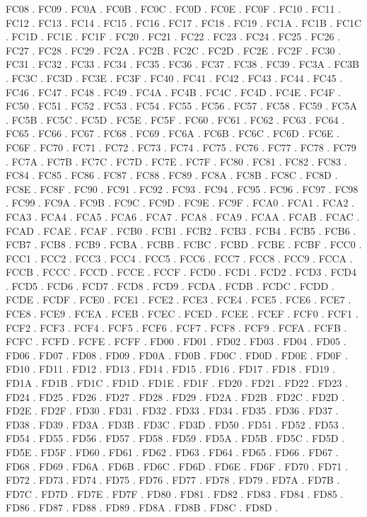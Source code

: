 FC08 .
FC09 .
FC0A .
FC0B .
FC0C .
FC0D .
FC0E .
FC0F .
FC10 .
FC11 .
FC12 .
FC13 .
FC14 .
FC15 .
FC16 .
FC17 .
FC18 .
FC19 .
FC1A .
FC1B .
FC1C .
FC1D .
FC1E .
FC1F .
FC20 .
FC21 .
FC22 .
FC23 .
FC24 .
FC25 .
FC26 .
FC27 .
FC28 .
FC29 .
FC2A .
FC2B .
FC2C .
FC2D .
FC2E .
FC2F .
FC30 .
FC31 .
FC32 .
FC33 .
FC34 .
FC35 .
FC36 .
FC37 .
FC38 .
FC39 .
FC3A .
FC3B .
FC3C .
FC3D .
FC3E .
FC3F .
FC40 .
FC41 .
FC42 .
FC43 .
FC44 .
FC45 .
FC46 .
FC47 .
FC48 .
FC49 .
FC4A .
FC4B .
FC4C .
FC4D .
FC4E .
FC4F .
FC50 .
FC51 .
FC52 .
FC53 .
FC54 .
FC55 .
FC56 .
FC57 .
FC58 .
FC59 .
FC5A .
FC5B .
FC5C .
FC5D .
FC5E .
FC5F .
FC60 .
FC61 .
FC62 .
FC63 .
FC64 .
FC65 .
FC66 .
FC67 .
FC68 .
FC69 .
FC6A .
FC6B .
FC6C .
FC6D .
FC6E .
FC6F .
FC70 .
FC71 .
FC72 .
FC73 .
FC74 .
FC75 .
FC76 .
FC77 .
FC78 .
FC79 .
FC7A .
FC7B .
FC7C .
FC7D .
FC7E .
FC7F .
FC80 .
FC81 .
FC82 .
FC83 .
FC84 .
FC85 .
FC86 .
FC87 .
FC88 .
FC89 .
FC8A .
FC8B .
FC8C .
FC8D .
FC8E .
FC8F .
FC90 .
FC91 .
FC92 .
FC93 .
FC94 .
FC95 .
FC96 .
FC97 .
FC98 .
FC99 .
FC9A .
FC9B .
FC9C .
FC9D .
FC9E .
FC9F .
FCA0 .
FCA1 .
FCA2 .
FCA3 .
FCA4 .
FCA5 .
FCA6 .
FCA7 .
FCA8 .
FCA9 .
FCAA .
FCAB .
FCAC .
FCAD .
FCAE .
FCAF .
FCB0 .
FCB1 .
FCB2 .
FCB3 .
FCB4 .
FCB5 .
FCB6 .
FCB7 .
FCB8 .
FCB9 .
FCBA .
FCBB .
FCBC .
FCBD .
FCBE .
FCBF .
FCC0 .
FCC1 .
FCC2 .
FCC3 .
FCC4 .
FCC5 .
FCC6 .
FCC7 .
FCC8 .
FCC9 .
FCCA .
FCCB .
FCCC .
FCCD .
FCCE .
FCCF .
FCD0 .
FCD1 .
FCD2 .
FCD3 .
FCD4 .
FCD5 .
FCD6 .
FCD7 .
FCD8 .
FCD9 .
FCDA .
FCDB .
FCDC .
FCDD .
FCDE .
FCDF .
FCE0 .
FCE1 .
FCE2 .
FCE3 .
FCE4 .
FCE5 .
FCE6 .
FCE7 .
FCE8 .
FCE9 .
FCEA .
FCEB .
FCEC .
FCED .
FCEE .
FCEF .
FCF0 .
FCF1 .
FCF2 .
FCF3 .
FCF4 .
FCF5 .
FCF6 .
FCF7 .
FCF8 .
FCF9 .
FCFA .
FCFB .
FCFC .
FCFD .
FCFE .
FCFF .
FD00 .
FD01 .
FD02 .
FD03 .
FD04 .
FD05 .
FD06 .
FD07 .
FD08 .
FD09 .
FD0A .
FD0B .
FD0C .
FD0D .
FD0E .
FD0F .
FD10 .
FD11 .
FD12 .
FD13 .
FD14 .
FD15 .
FD16 .
FD17 .
FD18 .
FD19 .
FD1A .
FD1B .
FD1C .
FD1D .
FD1E .
FD1F .
FD20 .
FD21 .
FD22 .
FD23 .
FD24 .
FD25 .
FD26 .
FD27 .
FD28 .
FD29 .
FD2A .
FD2B .
FD2C .
FD2D .
FD2E .
FD2F .
FD30 .
FD31 .
FD32 .
FD33 .
FD34 .
FD35 .
FD36 .
FD37 .
FD38 .
FD39 .
FD3A .
FD3B .
FD3C .
FD3D .
FD50 .
FD51 .
FD52 .
FD53 .
FD54 .
FD55 .
FD56 .
FD57 .
FD58 .
FD59 .
FD5A .
FD5B .
FD5C .
FD5D .
FD5E .
FD5F .
FD60 .
FD61 .
FD62 .
FD63 .
FD64 .
FD65 .
FD66 .
FD67 .
FD68 .
FD69 .
FD6A .
FD6B .
FD6C .
FD6D .
FD6E .
FD6F .
FD70 .
FD71 .
FD72 .
FD73 .
FD74 .
FD75 .
FD76 .
FD77 .
FD78 .
FD79 .
FD7A .
FD7B .
FD7C .
FD7D .
FD7E .
FD7F .
FD80 .
FD81 .
FD82 .
FD83 .
FD84 .
FD85 .
FD86 .
FD87 .
FD88 .
FD89 .
FD8A .
FD8B .
FD8C .
FD8D .
